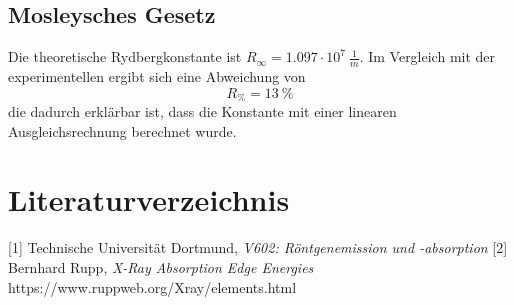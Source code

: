 \subsection{Mosleysches Gesetz}
Die theoretische Rydbergkonstante ist $R_{\infty}=1.097\cdot 10^{7}\ \frac{1}{m}$. Im Vergleich mit der experimentellen ergibt sich eine Abweichung von 
\begin{equation*}
  R_{\%}=13\ \%
\end{equation*}
die dadurch erklärbar ist, dass die Konstante mit einer linearen Ausgleichsrechnung berechnet wurde. 

\section{Literaturverzeichnis}
[1] Technische Universität Dortmund, \textit{V602: Röntgenemission und -absorption}
[2] Bernhard Rupp, \textit{X-Ray Absorption Edge Energies} https://www.ruppweb.org/Xray/elements.html
